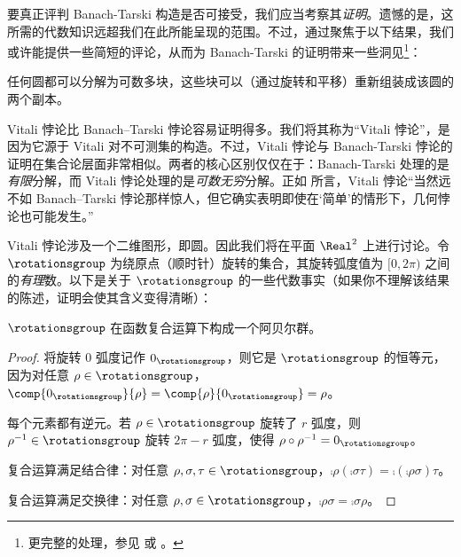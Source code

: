 \documentclass[../../../include/open-logic-section]{subfiles}
\begin{document}

要真正评判 Banach-Tarski 构造是否可接受，我们应当考察其\emph{证明}。遗憾的是，这所需的代数知识远超我们在此所能呈现的范围。不过，通过聚焦于以下结果，我们或许能提供一些简短的评论，从而为 Banach-Tarski 的证明带来一些洞见\footnote{更完整的处理，参见 \cite{Weston2003} 或 \cite{Wagon2016}。}：


\begin{thm}[Vitali 悖论]
任何圆都可以分解为可数多块，这些块可以（通过旋转和平移）重新组装成该圆的两个副本。
\end{thm}


Vitali 悖论比 Banach--Tarski 悖论容易证明得多。我们将其称为“Vitali 悖论”，是因为它源于 Vitali \citeyear{Vitali1905} 对不可测集的构造。不过，Vitali 悖论与 Banach-Tarski 悖论的证明在集合论层面非常相似。两者的核心区别仅仅在于：Banach-Tarski 处理的是\emph{有限}分解，而 Vitali 悖论处理的是\emph{可数无穷}分解。正如 \citet{Weston2003} 所言，Vitali 悖论“当然远不如 Banach--Tarski 悖论那样惊人，但它确实表明即使在‘简单’的情形下，几何悖论也可能发生。”

Vitali 悖论涉及一个二维图形，即圆。因此我们将在平面 $\Real^2$ 上进行讨论。令 $\rotationsgroup$ 为绕原点（顺时针）旋转的集合，其旋转弧度值为 $[0,2\pi)$ 之间的\emph{有理}数。以下是关于 $\rotationsgroup$ 的一些代数事实（如果你不理解该结果的陈述，证明会使其含义变得清晰）：


\begin{lem}
$\rotationsgroup$ 在函数复合运算下构成一个阿贝尔群。
\end{lem}

\begin{proof}
将旋转 $0$ 弧度记作 $0_{\rotationsgroup}$，则它是 $\rotationsgroup$ 的恒等元，因为对任意 $\rho \in \rotationsgroup$，$\comp{0_{\rotationsgroup}}{\rho} = \comp{\rho}{0_{\rotationsgroup}} =
\rho$。

每个元素都有逆元。若 $\rho \in \rotationsgroup$ 旋转了 $r$ 弧度，则 $\rho^{-1} \in \rotationsgroup$ 旋转 $2\pi - r$ 弧度，使得 $\rho \circ \rho^{-1} = 0_\rotationsgroup$。

复合运算满足结合律：对任意 $\rho, \sigma, \tau \in \rotationsgroup$，$\comp{\rho}{(\comp{\sigma}{\tau})} =
\comp{(\comp{\rho}{\sigma})}{\tau}$。

复合运算满足交换律：对任意 $\rho, \sigma \in \rotationsgroup$，$\comp{\rho}{\sigma} =
\comp{\sigma}{\rho}$。
\end{proof}
\end{document}

